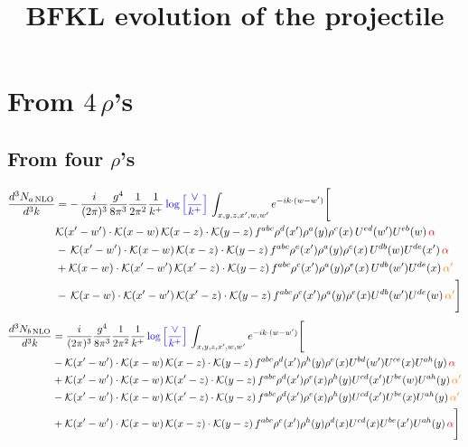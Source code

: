 \documentclass[9pt]{article}
\title{BFKL evolution of the projectile}
\author{}
\date{}
\numberwithin{equation}{section}
\begin{document}
\maketitle
\section{From $4$\,$\rho$'s}
\subsection{From four $\rho$'s}
\begin{align}
    \frac{d^{3}N_{a\,\rm NLO}}{d^{3}k} & = -\,\frac{i}{(2\pi)^{3}}\frac{g^{4}}{8\pi^{3}}\frac{1}{2\pi^{2}} \frac{1}{k^{+}}\,{\color{blue}\log{\left[\frac{\vee}{k^{+}}\right]}}\,\int_{x,y,z,x^{\prime},w,w^{\prime}}e^{-ik\cdot (w-w')} \Bigg[\notag \\ &  \mathcal{K}(x'-w')\cdot \mathcal{K}(x-w)\, \mathcal{K}(x-z)\cdot \mathcal{K}(y-z)\, f^{a b c} \rho^{d}(x') \rho^{a}(y) \rho^{c}(x)\,U^{ed}(w') U^{e b}(w)\,  {\color{red}\alpha} \nonumber\\
    &  -\,\mathcal{K}(x'-w')\cdot \mathcal{K}(x-w)\, \mathcal{K}(x-z)\cdot \mathcal{K}(y-z)\, f^{a b c} \rho^{e}(x') \rho^{a}(y) \rho^{c}(x)\, U^{d b}(w) U^{de}(x')\, {\color{red}\alpha} \nonumber\\
    & + \mathcal{K}(x-w)\cdot \mathcal{K}(x'-w')\, \mathcal{K}(x'-z)\cdot \mathcal{K}(y-z)\, f^{a b c} \rho^{c}(x') \rho^{a}(y) \rho^{e}(x)\,U^{d b}(w') U^{de}(x)\, {\color{orange} \alpha'} \nonumber\\
    & -\,\mathcal{K}(x-w)\cdot \mathcal{K}(x'-w')\, \mathcal{K}(x'-z)\cdot \mathcal{K}(y-z)\, f^{a b c} \rho^{c}(x') \rho^{a}(y) \rho^{e}(x) U^{db}(w') U^{de}(w)\, {\color{orange} \alpha'}\Bigg]
\end{align}
\begin{align}
      \frac{d^{3}N_{b\,\rm NLO}}{d^{3}k} & = \frac{i}{(2\pi)^{3}}\frac{g^{4}}{8\pi^{3}}\frac{1}{2\pi^{2}} \frac{1}{k^{+}}\,{\color{blue}\log{\left[\frac{\vee}{k^{+}}\right]}}\,\int_{x,y,z,x^{\prime},w,w^{\prime}}e^{-ik\cdot (w-w')} \Bigg[\notag \\ & - \mathcal{K}(x'-w')\cdot \mathcal{K}(x-w)\, \mathcal{K}(x-z)\cdot \mathcal{K}(y-z)\, f^{a b c} \rho^{d}(x') \rho^{h}(y) \rho^{e}(x) U^{bd}(w') U^{ce}(x) U^{a h}(y)\,{\color{red}\alpha} \nonumber\\
    &+ \mathcal{K}(x'-w')\cdot \mathcal{K}(x-w)\,\mathcal{K}(x'-z)\cdot \mathcal{K}(y-z)\, f^{a b c} \rho^{d}(x') \rho^{e}(x) \rho^{h}(y) U^{cd}(x') U^{be}(w) U^{a h}(y)\, {\color{orange} \alpha'}\nonumber\\
    &- \mathcal{K}(x'-w')\cdot \mathcal{K}(x-w)\,\mathcal{K}(x'-z)\cdot \mathcal{K}(y-z)\, f^{a b c} \rho^{d}(x') \rho^{e}(x) \rho^{h}(y) U^{cd}(x') U^{b e}(x) U^{a h}(y)\, {\color{orange} \alpha'}\nonumber\\
    &+  \mathcal{K}(x'-w')\cdot \mathcal{K}(x-w)\, \mathcal{K}(x-z)\cdot \mathcal{K}(y-z)\, f^{a b c} \rho^{e}(x') \rho^{h}(y) \rho^{d}(x) U^{cd}(x) U^{b e}(x') U^{a h}(y)\, {\color{red}\alpha}\Bigg]
\end{align}
\end{document}
